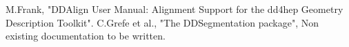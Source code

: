 \documentclass[10pt,a4paper]{article}
\begin{document}
\newpage
\begin{thebibliography}{9}

 M.Frank,
                   "DDAlign User Manual: 
                   Alignment Support for the dd4hep Geometry Description Toolkit".
 C.Grefe et al.,
                   "The DDSegmentation package", 
                   Non existing documentation to be written.
\end{thebibliography}
\end{document}
